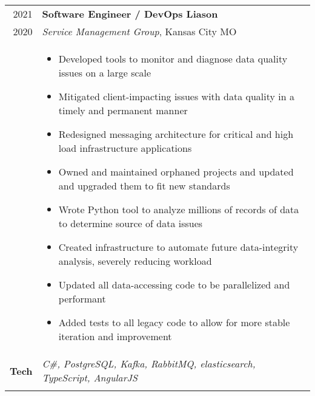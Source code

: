 \documentclass[a4paper,10pt]{article}
\newcommand{\br}{\\\multicolumn{2}{c}{}}
\begin{document}
\begin{tabular}{r p{15cm}}
  \textsc{2021}  & \textbf{Software Engineer / DevOps Liason} \\
  \textsc{2020}  & \textit{Service Management Group}, Kansas City MO
  \\ &
       \begin{itemize}
       \item Developed tools to monitor and diagnose data quality issues on a large scale
       \item Mitigated client-impacting issues with data quality in a timely and permanent manner
       \item Redesigned messaging architecture for critical and high load infrastructure applications
       \item Owned and maintained orphaned projects and updated and upgraded them to fit new standards
       \item Wrote Python tool to analyze millions of records of data to determine source of data issues
       \item Created infrastructure to automate future data-integrity analysis, severely reducing workload
       \item Updated all data-accessing code to be parallelized and performant
       \item Added tests to all legacy code to allow for more stable iteration and improvement
       \end{itemize} \\
  \textbf{Tech} & \textit{C\#, PostgreSQL, Kafka, RabbitMQ, elasticsearch, TypeScript, AngularJS} \br \\
\end{tabular}
\end{document}
